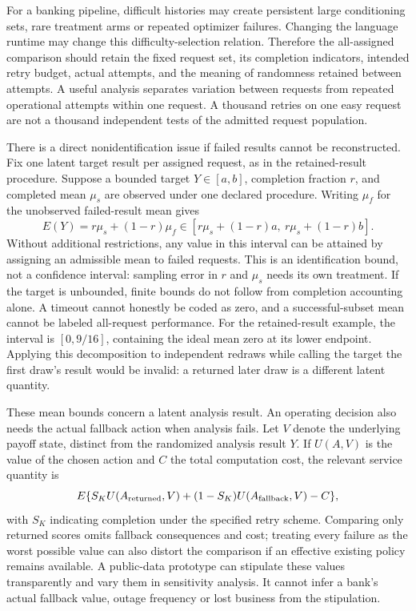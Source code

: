 For a banking pipeline, difficult histories may create persistent large
conditioning sets, rare treatment arms or repeated optimizer failures.
Changing the language runtime may change this difficulty-selection relation.
Therefore the all-assigned comparison should retain the fixed request set,
its completion indicators, intended retry budget, actual attempts, and the
meaning of randomness retained between attempts. A useful analysis separates
variation between requests from repeated operational attempts within one
request. A thousand retries on one easy request are not a thousand
independent tests of the admitted request population.

There is a direct nonidentification issue if failed results cannot be
reconstructed. Fix one latent target result per assigned request, as in the
retained-result procedure. Suppose a bounded target $Y\in[a,b]$, completion fraction
$r$, and completed mean $\mu_s$ are observed under one declared procedure.
Writing $\mu_f$ for the unobserved failed-result mean gives
\begin{equation}
 E(Y)=r\mu_s+(1-r)\mu_f
 \in[r\mu_s+(1-r)a,\ r\mu_s+(1-r)b].
 \label{exec17:s9-failure-bounds}
\end{equation}
Without additional restrictions, any value in this interval can be attained
by assigning an admissible mean to failed requests. This is an identification
bound, not a confidence interval: sampling error in $r$ and $\mu_s$ needs
its own treatment. If the target is unbounded, finite bounds do not follow
from completion accounting alone. A timeout cannot honestly be coded as
zero, and a successful-subset mean cannot be labeled all-request performance.
For the retained-result example, the interval is $[0,9/16]$, containing
the ideal mean zero at its lower endpoint. Applying this decomposition to
independent redraws while calling the target the first draw's result would
be invalid: a returned later draw is a different latent quantity.

These mean bounds concern a latent analysis result. An operating decision
also needs the actual fallback action when analysis fails. Let $V$ denote
the underlying payoff state, distinct from the randomized analysis result
$Y$. If $U(A,V)$ is
the value of the chosen action and $C$ the total computation cost, the
relevant service quantity is
\begin{equation}
 E\{S_K U(A_{\rm returned},V)+(1-S_K)U(A_{\rm fallback},V)-C\},
 \label{exec17:s9-service-value}
\end{equation}
with $S_K$ indicating completion under the specified retry scheme. Comparing
only returned scores omits fallback consequences and cost; treating every
failure as the worst possible value can also distort the comparison if an
effective existing policy remains available. A public-data prototype can
stipulate these values transparently and vary them in sensitivity analysis.
It cannot infer a bank's actual fallback value, outage frequency or lost
business from the stipulation.

